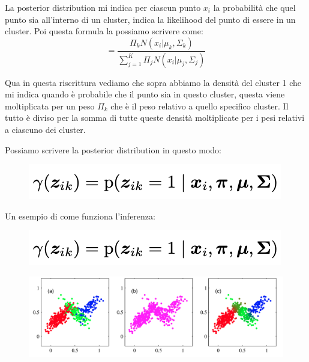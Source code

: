 \documentclass[14pt]{extreport}
\begin{document}
La posterior distribution mi indica per ciascun punto $x_i$ la probabilità che quel punto sia all'interno di un cluster, indica la likelihood del punto 
di essere in un cluster.
Poi questa formula la possiamo scrivere come:
$$= \frac{\Pi_k N(x_i|\mu_k, \Sigma_k)}{\sum_{j=1}^K \Pi_j N(x_i | \mu_j, \Sigma_j)}$$

Qua in questa riscrittura vediamo che sopra abbiamo la densità del cluster 1 che mi indica quando è probabile che il punto sia in questo cluster, questa
viene moltiplicata per un peso $\Pi_k$ che è il peso relativo a quello specifico cluster.
Il tutto è diviso per la somma di tutte queste densità moltiplicate per i pesi relativi a ciascuno dei cluster.

Possiamo scrivere la posterior distribution in questo modo:

\begin{figure}[H] 
\centering
\includegraphics[width=0.7\linewidth]{546.jpeg}
\end{figure}

Un esempio di come funziona l'inferenza:


\begin{figure}[H] 
\centering
\includegraphics[width=0.7\linewidth]{546.jpeg}
\end{figure}



\begin{figure}[H] 
\centering
\includegraphics[width=0.7\linewidth]{575.jpeg}
\end{figure}
\end{document}
